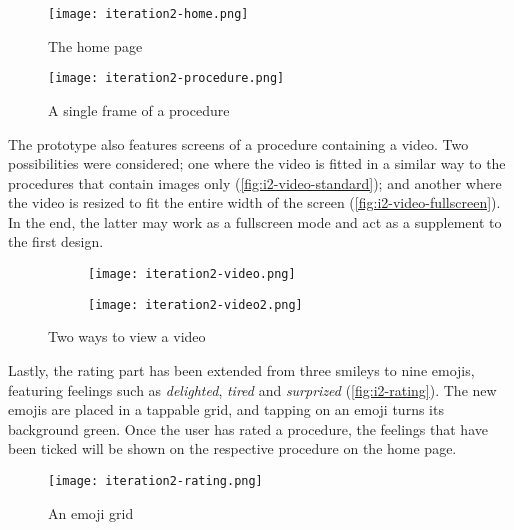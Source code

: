 \begin{figure}
    \centering
    \begin{minipage}{0.45\textwidth}
        \centering
        \texttt{[image: iteration2-home.png]}
        \caption{The home page}
        \label{fig:i2-home}
    \end{minipage}
    \begin{minipage}{0.45\textwidth}
        \centering
        \texttt{[image: iteration2-procedure.png]}
        \caption{A single frame of a procedure}
        \label{fig:i2-procedure}
    \end{minipage}
\end{figure}

The prototype also features screens of a procedure containing a video. Two possibilities were considered; one where the video is fitted in a similar way to the procedures that contain images only (\autoref{fig:i2-video-standard}); and another where the video is resized to fit the entire width of the screen (\autoref{fig:i2-video-fullscreen}). In the end, the latter may work as a fullscreen mode and act as a supplement to the first design.

\begin{figure}
    \centering
    \begin{subfigure}{0.45\textwidth}
        \centering
        \texttt{[image: iteration2-video.png]}
        \label{fig:i2-video-standard}
    \end{subfigure}
    \begin{subfigure}{0.45\textwidth}
        \centering
        \texttt{[image: iteration2-video2.png]}
        \label{fig:i2-video-fullscreen}
    \end{subfigure}
    \caption{Two ways to view a video}
    \label{fig:i2-video}
\end{figure}

Lastly, the rating part has been extended from three smileys to nine emojis, featuring feelings such as \emph{delighted}, \emph{tired} and \emph{surprized} (\autoref{fig:i2-rating}). The new emojis are placed in a tappable grid, and tapping on an emoji turns its background green. Once the user has rated a procedure, the feelings that have been ticked will be shown on the respective procedure on the home page.

\begin{figure}
    \centering
    \texttt{[image: iteration2-rating.png]}
    \caption{An emoji grid}
    \label{fig:i2-rating}
\end{figure}

